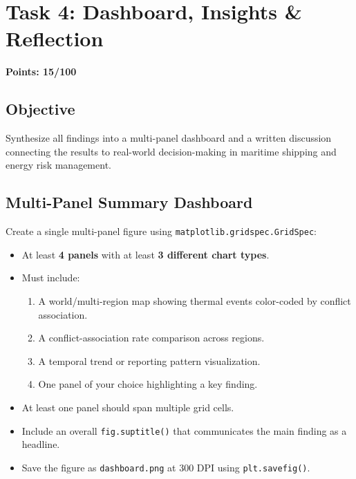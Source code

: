\documentclass[11pt]{article}
\begin{document}
\section{Task 4: Dashboard, Insights \& Reflection}
\noindent\textbf{Points: 15/100}

\subsection{Objective}
Synthesize all findings into a multi-panel dashboard and a written discussion connecting the results to real-world decision-making in maritime shipping and energy risk management.

\subsection{Multi-Panel Summary Dashboard}
Create a single multi-panel figure using \texttt{matplotlib.gridspec.GridSpec}:
\begin{itemize}
  \item At least \textbf{4 panels} with at least \textbf{3 different chart types}.
  \item Must include:
  \begin{enumerate}
    \item A world/multi-region map showing thermal events color-coded by conflict association.
    \item A conflict-association rate comparison across regions.
    \item A temporal trend or reporting pattern visualization.
    \item One panel of your choice highlighting a key finding.
  \end{enumerate}
  \item At least one panel should span multiple grid cells.
  \item Include an overall \texttt{fig.suptitle()} that communicates the main finding as a headline.
  \item Save the figure as \texttt{dashboard.png} at 300 DPI using \texttt{plt.savefig()}.
\end{itemize}
\end{document}
